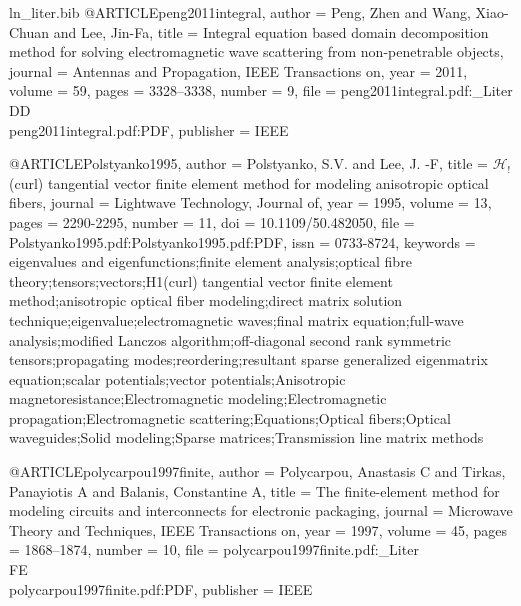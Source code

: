 \begin{filecontents*}{ln_liter.bib}
@ARTICLE{peng2011integral,
  author = {Peng, Zhen and Wang, Xiao-Chuan and Lee, Jin-Fa},
  title = {Integral equation based domain decomposition method for solving electromagnetic
	wave scattering from non-penetrable objects},
  journal = {Antennas and Propagation, IEEE Transactions on},
  year = {2011},
  volume = {59},
  pages = {3328--3338},
  number = {9},
  file = {peng2011integral.pdf:_Liter\\DD\\peng2011integral.pdf:PDF},
  publisher = {IEEE}
}

@ARTICLE{Polstyanko1995,
  author = {Polstyanko, S.V. and Lee, J. -F},
  title = {$\mathcal{H}_!$(curl) tangential vector finite element method for
	modeling anisotropic optical fibers},
  journal = {Lightwave Technology, Journal of},
  year = {1995},
  volume = {13},
  pages = {2290-2295},
  number = {11},
  doi = {10.1109/50.482050},
  file = {Polstyanko1995.pdf:Polstyanko1995.pdf:PDF},
  issn = {0733-8724},
  keywords = {eigenvalues and eigenfunctions;finite element analysis;optical fibre
	theory;tensors;vectors;H1(curl) tangential vector finite element
	method;anisotropic optical fiber modeling;direct matrix solution
	technique;eigenvalue;electromagnetic waves;final matrix equation;full-wave
	analysis;modified Lanczos algorithm;off-diagonal second rank symmetric
	tensors;propagating modes;reordering;resultant sparse generalized
	eigenmatrix equation;scalar potentials;vector potentials;Anisotropic
	magnetoresistance;Electromagnetic modeling;Electromagnetic propagation;Electromagnetic
	scattering;Equations;Optical fibers;Optical waveguides;Solid modeling;Sparse
	matrices;Transmission line matrix methods}
}

@ARTICLE{polycarpou1997finite,
  author = {Polycarpou, Anastasis C and Tirkas, Panayiotis A and Balanis, Constantine
	A},
  title = {The finite-element method for modeling circuits and interconnects
	for electronic packaging},
  journal = {Microwave Theory and Techniques, IEEE Transactions on},
  year = {1997},
  volume = {45},
  pages = {1868--1874},
  number = {10},
  file = {polycarpou1997finite.pdf:_Liter\\FE\\polycarpou1997finite.pdf:PDF},
  publisher = {IEEE}
}


\end{filecontents*}
